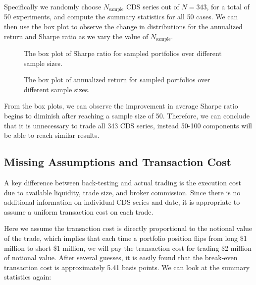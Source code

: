 \documentclass[11pt]{article}
\theoremstyle{definition}
\begin{document}
Specifically we randomly choose $N_\text{sample}$ 
CDS series out of $N = 343$, 
for a total of 50 experiments,
and compute the summary statistics for all 50 cases.
We can then use the box plot to observe the change in 
distributions for the annualized return and Sharpe ratio
as we vary the value of $N_\text{sample}$.

\begin{figure}[h]
\begin{center}
\end{center}
\centering
\caption{\label{fg:boxplot_sharpe}
The box plot of Sharpe ratio for sampled portfolios
over different sample sizes.
}
\end{figure}

\begin{figure}[h]
\begin{center}
\end{center}
\centering
\caption{\label{fg:boxplot_return}
The box plot of annualized return for sampled portfolios
over different sample sizes.
}
\end{figure}

From the box plots, we can observe the improvement 
in average Sharpe ratio begins to diminish 
after reaching a sample size of 50.
Therefore, we can conclude that it is unnecessary 
to trade all 343 CDS series, 
instead 50-100 components will be able to reach similar results.












\subsection{Missing Assumptions and Transaction Cost}

A key difference between back-testing and 
actual trading is the execution cost
due to available liquidity, trade size, 
and broker commission.
Since there is no additional information on 
individual CDS series and date,
it is appropriate to assume a uniform 
transaction cost on each trade.

Here we assume the transaction cost is 
directly proportional to the notional value 
of the trade, 
which implies that each time a portfolio 
position flips from long \$1 million to short 
\$1 million, we will pay the transaction cost 
for trading \$2 million of notional value.
After several guesses, it is easily found that 
the break-even transaction cost is approximately
5.41 basis points.
We can look at the summary statistics again:
\end{document}
